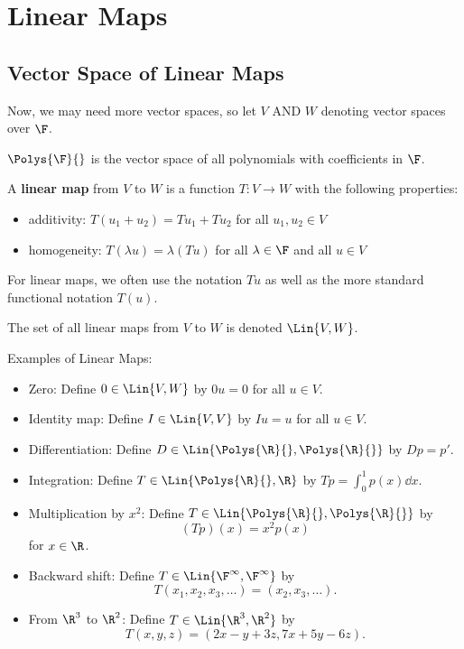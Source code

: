 
\section{Linear Maps}

\subsection{Vector Space of Linear Maps}

Now, we may need more vector spaces, so let $V$ AND $W$ denoting vector spaces
over $\F$.

\begin{definition} [$\Polys{\F}{\empty}$]
    $\Polys{\F}{\empty}$ is the vector space of all polynomials with coefficients in $\F$.
\end{definition}

\begin{definition} 
   A \textbf{linear map} from $V$ to $W$ is a function
   $T : V \to W$ with the following properties:
   \begin{itemize}
       \item additivity: $T(u_1 + u_2) = Tu_1 + Tu_2$ for all $u_1, u_2 \in V$
       \item homogeneity: $T(\lambda u) = \lambda(Tu)$ for all $\lambda \in \F$ and all $u \in V$
   \end{itemize}
\end{definition}

For linear maps, we often use the
notation $Tu$ as well as the more standard functional notation
$T(u)$.

\begin{definition} [$\Lin{V, W}$]
   The set of all linear maps from $V$ to $W$ is denoted
   $\Lin{V, W}$. 
\end{definition}

\begin{example} Examples of Linear Maps:
   \begin{itemize}
       \item Zero: Define $0 \in \Lin{V,W}$ by $0u = 0$ for all $u \in V$.
       \item Identity map: Define $I \in \Lin{V,V}$ by $Iu = u$ for all $u \in V$.
       \item Differentiation: Define $D \in \Lin{\Polys{\R}{\empty}, \Polys{\R}{\empty}}$ by $Dp = p'$.
       \item Integration: Define $T \in \Lin{\Polys{\R}{\empty}, \R}$ by $Tp = \int_0^1 p(x) \dd{x}$.
       \item Multiplication by $x^2$: Define $T \in \Lin{\Polys{\R}{\empty}, \Polys{\R}{\empty}}$ by
       \[ (Tp)(x) = x^2 p(x) \]
       for $x \in \R$.
       \item Backward shift: Define $T \in \Lin{\F^{\infty}, \F^{\infty}}$ by
       \[ T(x_1, x_2, x_3, \dots) = (x_2, x_3, \dots). \]
       \item From $\R^3$ to $\R^2$: Define $T \in \Lin{\R^3, \R^2}$ by
       \[ T(x, y, z) = (2x - y + 3z, 7x + 5y - 6z). \]
   \end{itemize} 
\end{example}

